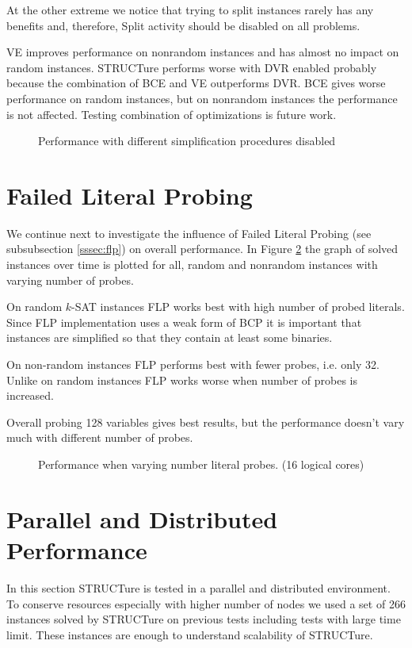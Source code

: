 At the other extreme we notice that trying to split instances rarely
has any benefits and, therefore, Split activity should be disabled
on all problems.

VE improves performance on nonrandom instances and has almost no
impact on random instances. STRUCTure performs worse with DVR
enabled probably because the combination of BCE and VE outperforms
DVR. BCE gives worse performance on random instances, but on
nonrandom instances the performance is not affected. Testing
combination of optimizations is future work.

\begin{figure}
  \centering
  \caption{Performance with different simplification procedures disabled}
  \label{fig:disable}
\end{figure}


\section{Failed Literal Probing}

We continue next to investigate the influence of Failed
Literal Probing (see subsubsection \ref{sssec:flp}) on overall
performance. In Figure \ref{fig:flp} the graph of solved instances
over time is plotted for all, random and nonrandom instances with
varying number of probes.

On random $k$-SAT instances FLP works best with high number of
probed literals. Since FLP implementation uses a weak form of BCP
it is important that instances are simplified so that they contain
at least some binaries.

On non-random instances FLP performs best with fewer probes,
i.e. only 32.  Unlike on random instances FLP works worse when
number of probes is increased.

Overall probing 128 variables gives best results, but the performance
doesn't vary much with different number of probes.

\begin{figure}
  \centering
  \caption{Performance when varying number literal probes. (16 logical cores)}
  \label{fig:flp}
\end{figure}


\section{Parallel and Distributed Performance}

In this section STRUCTure is tested in a parallel and distributed
environment. To conserve resources especially with higher number
of nodes we used a set of 266 instances solved by STRUCTure on
previous tests including tests with large time limit. These instances
are enough to understand scalability of STRUCTure.

